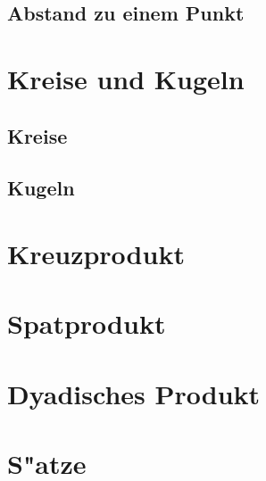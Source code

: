     \subsection{Abstand zu einem Punkt}



\section{Kreise und Kugeln}
    \subsection{Kreise}
    \subsection{Kugeln}
\section{Kreuzprodukt}
\section{Spatprodukt}
\section{Dyadisches Produkt}
\section{S"atze}

